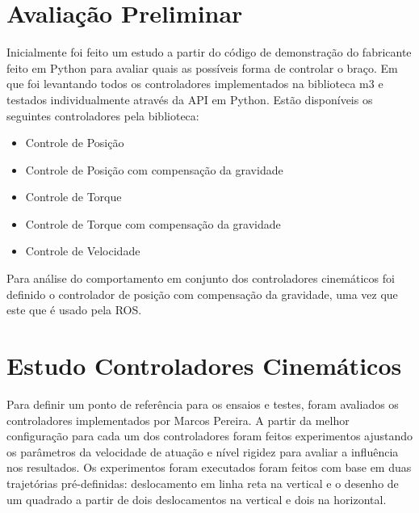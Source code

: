 

\section{Avaliação Preliminar}

Inicialmente foi feito um estudo a partir do código de demonstração do fabricante feito em Python para avaliar quais as possíveis forma de controlar o braço. Em que foi levantando todos os controladores implementados na biblioteca m3 e testados individualmente através da API em Python. Estão disponíveis os seguintes controladores pela biblioteca:

\begin{itemize}
    \item Controle de Posição
    \item Controle de Posição com compensação da gravidade
    \item Controle de Torque
    \item Controle de Torque com compensação da gravidade
    \item Controle de Velocidade
\end{itemize}


Para análise do comportamento em conjunto dos controladores cinemáticos foi definido o controlador de posição com compensação da gravidade, uma vez que este que é usado pela ROS.

\section{Estudo Controladores Cinemáticos}

Para definir um ponto de referência para os ensaios e testes, foram avaliados os controladores implementados por Marcos Pereira. A partir da melhor configuração para cada um dos controladores foram feitos experimentos ajustando os parâmetros da velocidade de atuação e nível rigidez para avaliar a influência nos resultados. Os experimentos foram executados foram feitos com base em duas trajetórias pré-definidas: deslocamento em linha reta na vertical e o desenho de um quadrado a partir de dois deslocamentos na vertical e dois na horizontal.

